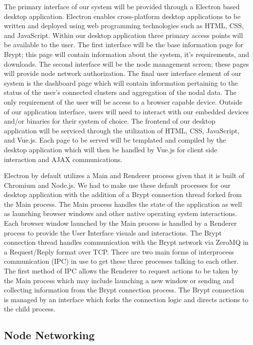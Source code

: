 \documentclass[tikz,a4paper,titlepage]{article}
\begin{document}
The primary interface of our system will be provided through a Electron based desktop application. Electron enables cross-platform desktop applications to be written and deployed using web programming technologies such as HTML, CSS, and JavaScript. Within our desktop application three primary access points will be available to the user. The first interface will be the base information page for Brypt; this page will contain information about the system, it’s requirements, and downloads. The second interface will be the node management screen; these pages will provide node network authorization. The final user interface element of our system is the dashboard page which will contain information pertaining to the status of the user’s connected clusters and aggregation of the nodal data. The only requirement of the user will be access to a browser capable device. Outside of our application interface, users will need to interact with our embedded devices and/or binaries for their system of choice. The frontend of our desktop application will be serviced through the utilization of HTML, CSS, JavaScript, and Vue.js. Each page to be served will be templated and compiled by the desktop application which will then be handled by Vue.js for client side interaction and AJAX communications. 

 Electron by default utilizes a Main and Renderer process given that it is built of Chromium and Node.js. We had to make use these default processes for our desktop application with the addition of a Brypt connection thread forked from the Main process. The Main process handles the state of the application as well as launching browser windows and other native operating system interactions. Each browser window launched by the Main process is handled by a Renderer process to provide the User Interface visuals and interactions. The Brypt connection thread handles communication with the Brypt network via ZeroMQ in a Request/Reply format over TCP. There are two main forms of interprocess communication (IPC) in use to get these three processes talking to each other. The first method of IPC allows the Renderer to request actions to be taken by the Main process which may include launching a new window or sending and collecting information from the Brypt connection process. The Brypt connection is managed by an interface which forks the connection logic and directs actions to the child process.

\subsection{Node Networking}
\end{document}

